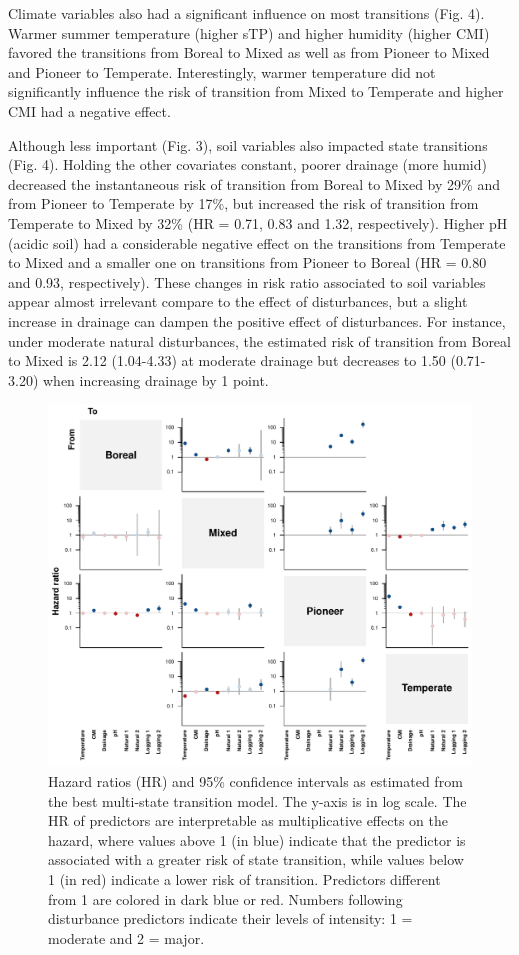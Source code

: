 \documentclass[a4paperpaper,]{article}
\begin{document}
Climate variables also had a significant influence on most transitions
(Fig. 4). Warmer summer temperature (higher sTP) and higher humidity
(higher CMI) favored the transitions from Boreal to Mixed as well as
from Pioneer to Mixed and Pioneer to Temperate. Interestingly, warmer
temperature did not significantly influence the risk of transition from
Mixed to Temperate and higher CMI had a negative effect.

Although less important (Fig. 3), soil variables also impacted state
transitions (Fig. 4). Holding the other covariates constant, poorer
drainage (more humid) decreased the instantaneous risk of transition
from Boreal to Mixed by 29\% and from Pioneer to Temperate by 17\%, but
increased the risk of transition from Temperate to Mixed by 32\% (HR =
0.71, 0.83 and 1.32, respectively). Higher pH (acidic soil) had a
considerable negative effect on the transitions from Temperate to Mixed
and a smaller one on transitions from Pioneer to Boreal (HR = 0.80 and
0.93, respectively). These changes in risk ratio associated to soil
variables appear almost irrelevant compare to the effect of
disturbances, but a slight increase in drainage can dampen the positive
effect of disturbances. For instance, under moderate natural
disturbances, the estimated risk of transition from Boreal to Mixed is
2.12 (1.04-4.33) at moderate drainage but decreases to 1.50 (0.71-3.20)
when increasing drainage by 1 point.

\begin{figure}
\centering
\includegraphics{res/fig4_HR.pdf}
\caption{Hazard ratios (HR) and 95\% confidence intervals as estimated
from the best multi-state transition model. The y-axis is in log scale.
The HR of predictors are interpretable as multiplicative effects on the
hazard, where values above 1 (in blue) indicate that the predictor is
associated with a greater risk of state transition, while values below 1
(in red) indicate a lower risk of transition. Predictors different from
1 are colored in dark blue or red. Numbers following disturbance
predictors indicate their levels of intensity: 1 = moderate and 2 =
major.}
\end{figure}
\end{document}

